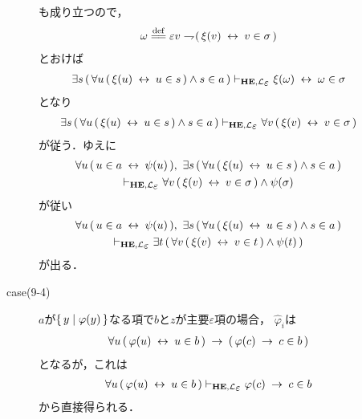 \begin{metaprf}
\begin{description}
\begin{description}
						も成り立つので，
						\begin{align}
							\omega \defeq \varepsilon v \negation (\, \xi(v) \lrarrow v \in \sigma\, )
						\end{align}
						とおけば
						\begin{align}
							\exists s\, (\, \forall u\, (\, \xi(u) \lrarrow u \in s\, ) \wedge s \in a\, ) 
							\provable{\mbox{{\bf HE}},\lang{\varepsilon}} \xi(\omega) \lrarrow \omega \in \sigma
						\end{align}
						となり
						\begin{align}
							\exists s\, (\, \forall u\, (\, \xi(u) \lrarrow u \in s\, ) \wedge s \in a\, ) 
							\provable{\mbox{{\bf HE}},\lang{\varepsilon}} \forall v\, (\, \xi(v) \lrarrow v \in \sigma\, )
						\end{align}
						が従う．ゆえに
						\begin{align}
							\begin{gathered}
								\forall u\, (\, u \in a \lrarrow \psi(u)\, ),\ 
								\exists s\, (\, \forall u\, (\, \xi(u) \lrarrow u \in s\, ) \wedge s \in a\, ) \\
								\provable{\mbox{{\bf HE}},\lang{\varepsilon}} \forall v\, (\, \xi(v) \lrarrow v \in \sigma\, ) \wedge \psi(\sigma)
							\end{gathered}
						\end{align}
						が従い
						\begin{align}
							\begin{gathered}
								\forall u\, (\, u \in a \lrarrow \psi(u)\, ),\ 
								\exists s\, (\, \forall u\, (\, \xi(u) \lrarrow u \in s\, ) \wedge s \in a\, ) \\
								\provable{\mbox{{\bf HE}},\lang{\varepsilon}} \exists t\, (\, \forall v\, (\, \xi(v) \lrarrow v \in t\, ) \wedge \psi(t)\, )
							\end{gathered}
						\end{align}
						が出る．
						
					\item[case(9-4)] $a$が$\{\, y \mid \varphi(y)\, \}$なる項で$b$と$z$が主要$\varepsilon$項の場合，
						$\widehat{\varphi}_{i}$は
						\begin{align}
							\forall u\, (\, \varphi(u) \hspace{0.25em}\leftrightarrow\hspace{0.25em} u \in b\, ) 
							\hspace{0.25em}\rightarrow\hspace{0.25em} (\, \varphi(c) \hspace{0.25em}\rightarrow\hspace{0.25em} c \in b\, )
						\end{align}
						となるが，これは
						\begin{align}
							\forall u\, (\, \varphi(u) \lrarrow u \in b\, ) 
							\provable{\mbox{{\bf HE}},\lang{\varepsilon}} 
							\varphi(c) \rarrow c \in b
						\end{align}
						から直接得られる．
						

\end{description}
\end{description}
\end{metaprf}
